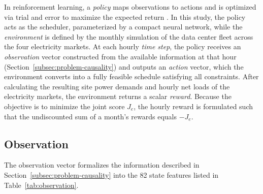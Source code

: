 \documentclass{UNCC-thesis}
\begin{document}
In reinforcement learning, a \emph{policy} maps observations to actions and is optimized
via trial and error to maximize the expected return \cite{sutton2018reinforcement}.
In this study, the policy acts as the scheduler, parameterized by a compact neural network,
while the \emph{environment} is defined by the monthly simulation of the data center fleet
across the four electricity markets. At each hourly \emph{time step}, the policy receives an
\emph{observation} vector constructed from the available information at that hour
(Section~\ref{subsec:problem-causality}) and outputs an \emph{action} vector, which the
environment converts into a fully feasible schedule satisfying all constraints. After
calculating the resulting site power demands and hourly net loads of the electricity markets,
the environment returns a scalar \emph{reward}. Because
the objective is to minimize the joint score \(J_e\), the hourly reward is formulated such
that the undiscounted sum of a month's rewards equals \(-J_e\).

\subsection{Observation}
\label{sec:method-observation}

The observation vector formalizes the information described in
Section~\ref{subsec:problem-causality} into the 82 state features listed in
Table~\ref{tab:observation}.
\end{document}
